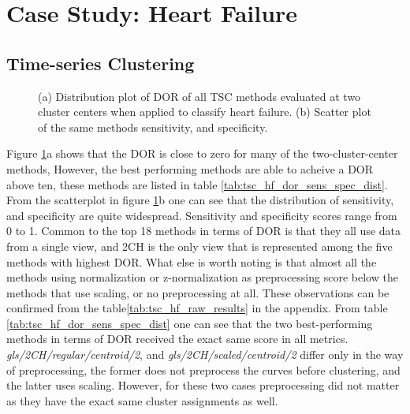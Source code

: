 \section{Case Study: Heart Failure}

\subsection{Time-series Clustering}

\begin{figure}[htb]
    \centering
    
    \caption{(a) Distribution plot of DOR of all TSC methods evaluated at two cluster centers when applied to classify heart failure.
             (b) Scatter plot of the same methods sensitivity, and specificity.}
    \label{fig:tsc_hf_dor_sens_spec_dist}
\end{figure}

Figure \ref{fig:tsc_hf_dor_sens_spec_dist}a shows that the DOR is close to zero for many of the two-cluster-center methods, 
However, the best performing methods are able to acheive a DOR above ten, these methods are listed in table \ref{tab:tsc_hf_dor_sens_spec_dist}.
From the scatterplot in figure \ref{fig:tsc_hf_dor_sens_spec_dist}b one can see that the distribution of sensitivity, and specificity are quite widespread.
Sensitivity and specificity scores range from 0 to 1.
Common to the top 18 methods in terms of DOR is that they all use data from a single view, and 2CH is the only view that is represented among the five methods with highest DOR.
What else is worth noting is that almost all the methods using normalization or z-normalization as preprocessing score below the methods that use scaling, or no preprocessing at all.
These observations can be confirmed from the table\ref{tab:tsc_hf_raw_results} in the appendix. 
From table \ref{tab:tsc_hf_dor_sens_spec_dist} one can see that the two best-performing methods in terms of DOR received the exact same score in all metrics.
\textit{gls/2CH/regular/centroid/2}, and \textit{gls/2CH/scaled/centroid/2} differ only in the way of preprocessing, the former does not preprocess the curves before clustering,
and the latter uses scaling. However, for these two cases preprocessing did not matter as they have the exact same cluster assignments as well.
\bigskip

